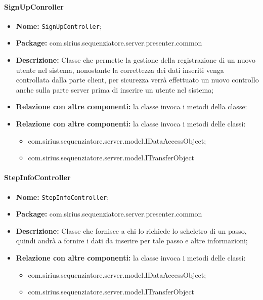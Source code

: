 \paragraph{SignUpConroller}
	\begin{itemize}
		\item \textbf{Nome:} \texttt{SignUpController};
		\item \textbf{Package:} com.sirius.sequenziatore.server.presenter.common
		\item \textbf{Descrizione:} Classe che permette la gestione della registrazione di un nuovo utente nel sistema, nonostante la correttezza dei dati inseriti venga controllata dalla parte client, per sicurezza verrà effettuato un nuovo controllo anche sulla parte server prima di inserire un utente nel sistema;
		\item \textbf{Relazione con altre componenti:} la classe invoca i metodi della classe:
		\item \textbf{Relazione con altre componenti:} la classe invoca i metodi delle classi:
		\begin{itemize}
			\item com.sirius.sequenziatore.server.model.IDataAccessObject;
			\item com.sirius.sequenziatore.server.model.ITransferObject
		\end{itemize}
	\end{itemize}
	
\paragraph{StepInfoController}
	\begin{itemize}
		\item \textbf{Nome:} \texttt{StepInfoController};
		\item \textbf{Package:} com.sirius.sequenziatore.server.presenter.common
		\item \textbf{Descrizione:} Classe che fornisce a chi lo richiede lo scheletro di un passo, quindi andrà a fornire i dati da inserire per tale passo e altre informazioni;
		\item \textbf{Relazione con altre componenti:} la classe invoca i metodi delle classi:
		\begin{itemize}
			\item com.sirius.sequenziatore.server.model.IDataAccessObject;
			\item com.sirius.sequenziatore.server.model.ITransferObject
		\end{itemize}
	\end{itemize}
